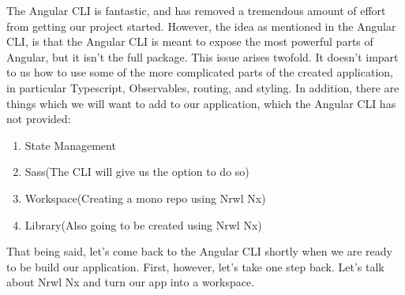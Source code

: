The Angular CLI is fantastic, and has removed a tremendous amount of effort from
getting our project started. However, the idea as mentioned in the Angular CLI,
is that the Angular CLI is meant to expose the most powerful parts of Angular,
but it isn't the full package. This issue arises twofold. It doesn't impart to
us how to use some of the more complicated parts of the created application, in
particular Typescript, Observables, routing, and styling. In addition,
there are things which we will want to add to our application, which the Angular
CLI has not provided:
\begin{enumerate}
  \item State Management
  \item Sass(The CLI will give us the option to do so)
  \item Workspace(Creating a mono repo using Nrwl Nx)
  \item Library(Also going to be created using Nrwl Nx)
\end{enumerate}

That being said, let's come back to the Angular CLI shortly when we are ready
to be build our application. First, however, let's take one step back. Let's
talk about Nrwl Nx and turn our app into a workspace.
